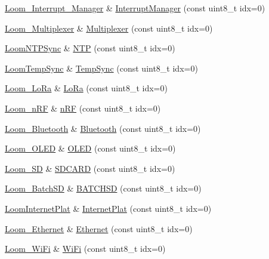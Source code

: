 \begin{DoxyCompactItemize}
\item 
\hyperlink{class_loom___interrupt___manager}{Loom\+\_\+\+Interrupt\+\_\+\+Manager} \& \hyperlink{class_loom_manager_a3f1035d71a04b36efd65f1cbe7d08b78}{Interrupt\+Manager} (const uint8\+\_\+t idx=0)
\item 
\hyperlink{class_loom___multiplexer}{Loom\+\_\+\+Multiplexer} \& \hyperlink{class_loom_manager_af6d071b9bc9e0654b6f5763db83233b0}{Multiplexer} (const uint8\+\_\+t idx=0)
\item 
\hyperlink{class_loom_n_t_p_sync}{Loom\+N\+T\+P\+Sync} \& \hyperlink{class_loom_manager_a51070b9737159a7880072997297959c3}{N\+TP} (const uint8\+\_\+t idx=0)
\item 
\hyperlink{class_loom_temp_sync}{Loom\+Temp\+Sync} \& \hyperlink{class_loom_manager_ad80f6ceba81939515ab09f92434bb13e}{Temp\+Sync} (const uint8\+\_\+t idx=0)
\item 
\hyperlink{class_loom___lo_ra}{Loom\+\_\+\+Lo\+Ra} \& \hyperlink{class_loom_manager_a28246e651c56b8c8cc0f5175f098930f}{Lo\+Ra} (const uint8\+\_\+t idx=0)
\item 
\hyperlink{class_loom__n_r_f}{Loom\+\_\+n\+RF} \& \hyperlink{class_loom_manager_a00d23f62214984206a17c4b643f9e4f6}{n\+RF} (const uint8\+\_\+t idx=0)
\item 
\hyperlink{class_loom___bluetooth}{Loom\+\_\+\+Bluetooth} \& \hyperlink{class_loom_manager_a2186c9c3f21fd48dafda59351c65b9bc}{Bluetooth} (const uint8\+\_\+t idx=0)
\item 
\hyperlink{class_loom___o_l_e_d}{Loom\+\_\+\+O\+L\+ED} \& \hyperlink{class_loom_manager_a7d3b807d669ad51f35aafc5115c6583a}{O\+L\+ED} (const uint8\+\_\+t idx=0)
\item 
\hyperlink{class_loom___s_d}{Loom\+\_\+\+SD} \& \hyperlink{class_loom_manager_abbbbfdf6def923bc70d7e5e7d806fe67}{S\+D\+C\+A\+RD} (const uint8\+\_\+t idx=0)
\item 
\hyperlink{class_loom___batch_s_d}{Loom\+\_\+\+Batch\+SD} \& \hyperlink{class_loom_manager_a9fad8dc02b66ec73bb0247b89edf98c4}{B\+A\+T\+C\+H\+SD} (const uint8\+\_\+t idx=0)
\item 
\hyperlink{class_loom_internet_plat}{Loom\+Internet\+Plat} \& \hyperlink{class_loom_manager_ac7f70773b0c757611897f8865f6435ec}{Internet\+Plat} (const uint8\+\_\+t idx=0)
\item 
\hyperlink{class_loom___ethernet}{Loom\+\_\+\+Ethernet} \& \hyperlink{class_loom_manager_a9727086e76045344ab9f10542cf7ab35}{Ethernet} (const uint8\+\_\+t idx=0)
\item 
\hyperlink{class_loom___wi_fi}{Loom\+\_\+\+Wi\+Fi} \& \hyperlink{class_loom_manager_a52b36254942ce3e0f91212416258963d}{Wi\+Fi} (const uint8\+\_\+t idx=0)

\end{DoxyCompactItemize}
